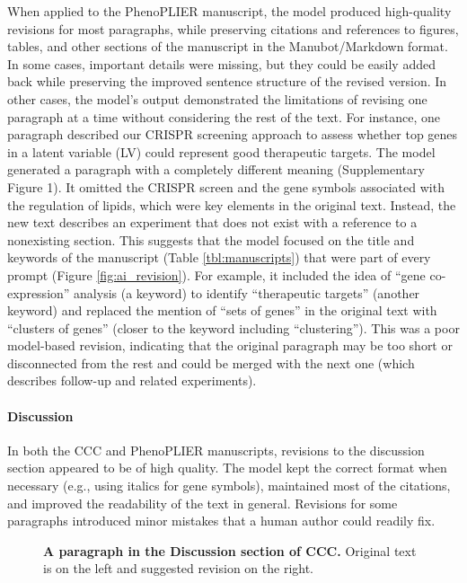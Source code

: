 \documentclass[
]{article}
\begin{document}
When applied to the PhenoPLIER manuscript, the model produced high-quality revisions for most paragraphs, while preserving citations and references to figures, tables, and other sections of the manuscript in the Manubot/Markdown format.
In some cases, important details were missing, but they could be easily added back while preserving the improved sentence structure of the revised version.
In other cases, the model's output demonstrated the limitations of revising one paragraph at a time without considering the rest of the text.
For instance, one paragraph described our CRISPR screening approach to assess whether top genes in a latent variable (LV) could represent good therapeutic targets.
The model generated a paragraph with a completely different meaning (Supplementary Figure 1).
It omitted the CRISPR screen and the gene symbols associated with the regulation of lipids, which were key elements in the original text.
Instead, the new text describes an experiment that does not exist with a reference to a nonexisting section.
This suggests that the model focused on the title and keywords of the manuscript (Table \ref{tbl:manuscripts}) that were part of every prompt (Figure \ref{fig:ai_revision}).
For example, it included the idea of ``gene co-expression'' analysis (a keyword) to identify ``therapeutic targets'' (another keyword) and replaced the mention of ``sets of genes'' in the original text with ``clusters of genes'' (closer to the keyword including ``clustering'').
This was a poor model-based revision, indicating that the original paragraph may be too short or disconnected from the rest and could be merged with the next one (which describes follow-up and related experiments).

\hypertarget{discussion}{%
\paragraph{Discussion}\label{discussion}}

In both the CCC and PhenoPLIER manuscripts, revisions to the discussion section appeared to be of high quality.
The model kept the correct format when necessary (e.g., using italics for gene symbols), maintained most of the citations, and improved the readability of the text in general.
Revisions for some paragraphs introduced minor mistakes that a human author could readily fix.

\begin{figure}
\hypertarget{fig:discussion:ccc}{%
\centering

\caption{\textbf{A paragraph in the Discussion section of CCC.}
Original text is on the left and suggested revision on the right.}\label{fig:discussion:ccc}
}
\end{figure}
\end{document}
